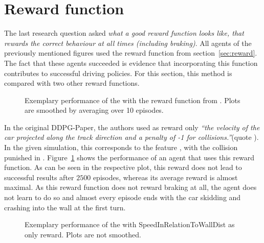 \section{Reward function}

The last research question asked \textit{what a good reward function looks like, that rewards the \textit{correct} behaviour at all times (including braking)}. All agents of the previously mentioned figures used the reward function from section~\ref{sec:reward}. The fact that these agents succeeded is evidence that incorporating this function contributes to successful driving policies. For this section, this method is compared with two other reward functions. 

\begin{figure}[h]
	{%
		\setlength{\fboxsep}{0pt}%
		\setlength{\fboxrule}{1pt}%
	}%
	\centering
	\caption[Exemplary performance of the  with the reward function from \cite{lillicrap_continuous_2015}]{Exemplary performance of the  with the reward function from \cite{lillicrap_continuous_2015}. Plots are smoothed by averaging over 10 episodes.}
	\label{fig:dqnrewardspeedstuff}
\end{figure}

In the original DDPG-Paper, the authors used as reward only \textit{``the velocity of the car projected along the track direction and a penalty of -1 for collisions.''}(quote \cite{lillicrap_continuous_2015}). In the given simulation, this corresponds to the feature , with the collision punished in . Figure~\ref{fig:dqnrewardspeedstuff} shows the performance of an agent that uses this reward function. 
As can be seen in the respective plot, this reward does not lead to successful results after $2500$ episodes, whereas its average reward is almost maximal. As this reward function does not reward braking at all, the agent does not learn to do so and almost every episode ends with the car skidding and crashing into the wall at the first turn.

\begin{figure}[h]
	{%
		\setlength{\fboxsep}{0pt}%
		\setlength{\fboxrule}{1pt}%
	}%
	\centering
	\caption[Exemplary performance of the  with SpeedInRelationToWallDist as only reward.]{Exemplary performance of the  with SpeedInRelationToWallDist as only reward. Plots are not smoothed.}
	\label{fig:dqnrewardinrelationtowall}
\end{figure}

